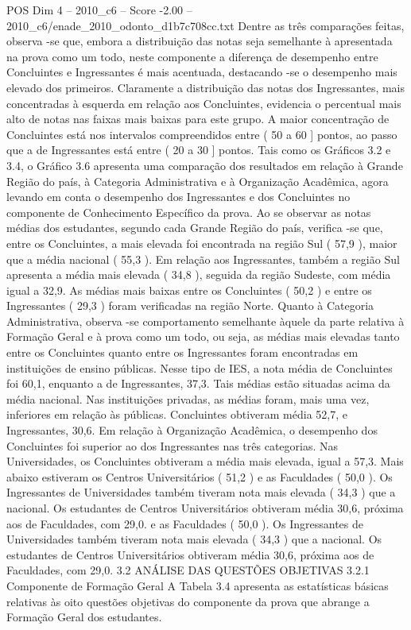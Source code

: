 \begin{textsample}{POS Dim 4 – 2010\_c6 – Score -2.00 – 2010\_c6/enade\_2010\_odonto\_d1b7c708cc.txt}
Dentre as três comparações feitas, observa -se que, embora a distribuição das notas seja semelhante à apresentada na prova como um todo, neste componente a diferença de desempenho entre Concluintes e Ingressantes é mais acentuada, destacando -se o desempenho mais elevado dos primeiros.
Claramente a distribuição das notas dos Ingressantes, mais concentradas à esquerda em relação aos Concluintes, evidencia o percentual mais alto de notas nas faixas mais baixas para este grupo.
A maior concentração de Concluintes está nos intervalos compreendidos entre ( 50 a 60 ] pontos, ao passo que a de Ingressantes está entre ( 20 a 30 ] pontos.
Tais como os Gráficos 3.2 e 3.4, o Gráfico 3.6 apresenta uma comparação dos resultados em relação à Grande Região do país, à Categoria Administrativa e à Organização Acadêmica, agora levando em conta o desempenho dos Ingressantes e dos Concluintes no componente de Conhecimento Específico da prova.
Ao se observar as notas médias dos estudantes, segundo cada Grande Região do país, verifica -se que, entre os Concluintes, a mais elevada foi encontrada na região Sul ( 57,9 ), maior que a média nacional ( 55,3 ).
Em relação aos Ingressantes, também a região Sul apresenta a média mais elevada ( 34,8 ), seguida da região Sudeste, com média igual a 32,9.
As médias mais baixas entre os Concluintes ( 50,2 ) e entre os Ingressantes ( 29,3 ) foram verificadas na região Norte.
Quanto à Categoria Administrativa, observa -se comportamento semelhante àquele da parte relativa à Formação Geral e à prova como um todo, ou seja, as médias mais elevadas tanto entre os Concluintes quanto entre os Ingressantes foram encontradas em instituições de ensino públicas.
Nesse tipo de IES, a nota média de Concluintes foi 60,1, enquanto a de Ingressantes, 37,3.
Tais médias estão situadas acima da média nacional.
Nas instituições privadas, as médias foram, mais uma vez, inferiores em relação às públicas.
Concluintes obtiveram média 52,7, e Ingressantes, 30,6.
Em relação à Organização Acadêmica, o desempenho dos Concluintes foi superior ao dos Ingressantes nas três categorias.
Nas Universidades, os Concluintes obtiveram a média mais elevada, igual a 57,3.
Mais abaixo estiveram os Centros Universitários ( 51,2 ) e as Faculdades ( 50,0 ).
Os Ingressantes de Universidades também tiveram nota mais elevada ( 34,3 ) que a nacional.
Os estudantes de Centros Universitários obtiveram média 30,6, próxima aos de Faculdades, com 29,0. e as Faculdades ( 50,0 ).
Os Ingressantes de Universidades também tiveram nota mais elevada ( 34,3 ) que a nacional.
Os estudantes de Centros Universitários obtiveram média 30,6, próxima aos de Faculdades, com 29,0. 3.2 ANÁLISE DAS QUESTÕES OBJETIVAS 3.2.1 Componente de Formação Geral A Tabela 3.4 apresenta as estatísticas básicas relativas às oito questões objetivas do componente da prova que abrange a Formação Geral dos estudantes.

\end{textsample}

